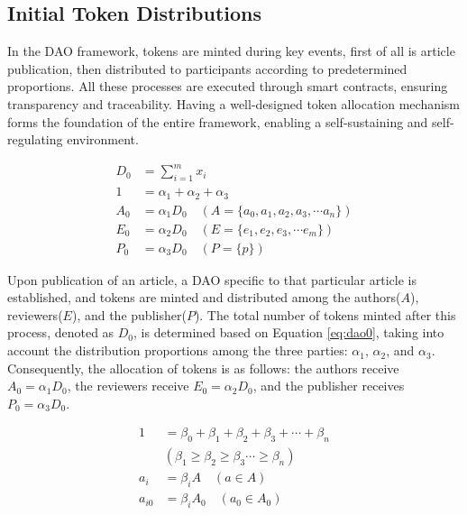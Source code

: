 \documentclass[lettersize,journal]{IEEEtran}
\begin{document}
\subsection{Initial Token Distributions}

In the DAO framework, tokens are minted during key events, first of all is article publication, then distributed to participants according to predetermined proportions. All these processes are executed through smart contracts, ensuring transparency and traceability. Having a well-designed token allocation mechanism forms the foundation of the entire framework, enabling a self-sustaining and self-regulating environment.


\begin{equation}
  \begin{aligned}
    D_0 &= \sum_{i = 1}^{m}x_i \\
    1 &= \alpha_1 + \alpha_2 + \alpha_3 \\
    A_0 &= \alpha_1 D_0 \quad (A=\{a_0, a_1, a_2, a_3, \cdots a_n\}) \\
    E_0 &= \alpha_2 D_0 \quad (E=\{e_1, e_2, e_3, \cdots e_m\}) \\
    P_0 &= \alpha_3 D_0 \quad (P=\{p\})
  \end{aligned}
  \label{eq:dao0}
\end{equation}

Upon publication of an article, a DAO specific to that particular article is established, and tokens are minted and distributed among the authors($A$), reviewers($E$), and the publisher($P$). The total number of tokens minted after this process, denoted as $D_0$, is determined based on Equation \ref{eq:dao0}, taking into account the distribution proportions among the three parties: $\alpha_1$, $\alpha_2$, and $\alpha_3$. Consequently, the allocation of tokens is as follows: the authors receive $A_0 = \alpha_1 D_0$, the reviewers receive $E_0 = \alpha_2 D_0$, and the publisher receives $P_0 = \alpha_3 D_0$.


\begin{equation}
  \begin{aligned}
    1 &= \beta_0 + \beta_1 + \beta_2 + \beta_3 + \cdots + \beta_n \\
    &(\beta_1 \geq  \beta_2 \geq \beta_3 \cdots \geq \beta_n)\\
    a_{i} &= \beta_i A \quad (a \in A) \\
    a_{i0} &= \beta_i A_0 \quad (a_0 \in A_0 )
  \end{aligned}
  \label{eq:authorrate}
\end{equation}
\end{document}

